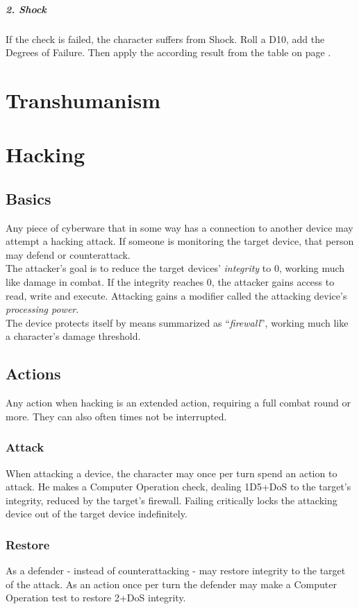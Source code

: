 \documentclass[12pt,a4paper,openany,dvipsnames]{book}
\begin{document}
	\paragraph{2. Shock}
	If the check is failed, the character suffers from Shock.
	Roll a D10, add the Degrees of Failure.
	Then apply the according result from the table on page \pageref{feartable}.

	\chapter{Transhumanism}
	

	\chapter{Hacking}
	\section{Basics}
	Any piece of cyberware that in some way has a connection to another device may attempt a hacking attack. If someone is monitoring the target device, that person may defend or counterattack.\\
	The attacker’s goal is to reduce the target devices’ \emph{integrity} to 0, working much like damage in combat. If the integrity reaches 0, the attacker gains access to read, write and execute. Attacking gains a modifier called the attacking device’s \emph{processing power}.\\
	The device protects itself by means summarized as “\emph{firewall}”, working much like a character’s damage threshold.
	\section{Actions}
	Any action when hacking is an extended action, requiring a full combat round or more. They can also often times not be interrupted.
	\subsection*{Attack}
	When attacking a device, the character may once per turn spend an action to attack.
	He makes a Computer Operation check,
		dealing 1D5+DoS to the target’s integrity,
		reduced by the target’s firewall.
	Failing critically locks the attacking device out of the target device indefinitely.
	\subsection*{Restore}
	As a defender - instead of counterattacking - may restore integrity to the target of the attack. As an action once per turn the defender may make a Computer Operation test to restore 2+DoS integrity.
\end{document}

